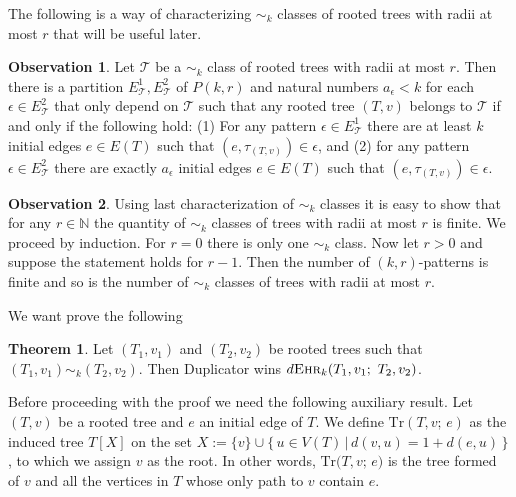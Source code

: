 \documentclass[12pt,notitlepage,a4paper]{article}
\theoremstyle{definition}
\newtheorem{theorem}{Theorem}[section]
\newtheorem{obs}{Observation}[section]
\newcommand{\N}{\mathbb{N}}
\newcommand{\ehr}{\textsc{Ehr}}
\begin{document}
The following is a way of characterizing $\sim_k$ classes
of rooted trees with radii at most $r$ that will be useful later. 

\begin{obs}\label{obs:equivalenttrees}
Let $\mathcal{T}$ be a $\sim_k$ class of rooted trees with
radii at most $r$. Then there is a partition $E^1_\mathcal{T},
E^2_\mathcal{T}$ of $P(k,r)$ and natural numbers $a_\epsilon<k$
for each $\epsilon\in E^2_\mathcal{T}$ that only depend on 
$\mathcal{T}$ such that any rooted tree $(T,v)$ belongs to
$\mathcal{T}$ if and only if the following hold: (1) For any pattern 
$\epsilon\in E^1_\mathcal{T}$ there are at least $k$ initial edges $e\in E(T)$ such that
$(e,\tau_{(T,v)})\in \epsilon$, and (2) for any pattern 
$\epsilon\in E^2_\mathcal{T}$ there are exactly
$a_\epsilon$ initial edges $e\in E(T)$ such that
$(e,\tau_{(T,v)})\in \epsilon$.	
\end{obs}

\begin{obs}\label{obs:finitetrees}
	Using last characterization of $\sim_k$ classes
	it is easy to show that for any $r\in \N$ the quantity
	of $\sim_k$ classes of trees with radii at most $r$ is finite. 
	We proceed by induction. For $r=0$ there is only one $\sim_k$ class.
	Now let $r>0$ and suppose the statement holds for $r-1$. Then
	the number of $(k,r)$-patterns is finite and so is the number
	of $\sim_k$ classes of trees with radii at most $r$. 
\end{obs}


We want prove the following
\begin{theorem} \label{thm:equivalenttrees} 
	Let $(T_1,v_1)$ and $(T_2,v_2)$ be rooted trees such
	that $(T_1,v_1)\sim_k (T_2,v_2)$.
	Then Duplicator wins
	$d\ehr_{k}(T_1,v_1;\, \, T_2,v_2)$.
\end{theorem}

Before proceeding with the proof we need the following auxiliary
result. Let $(T,v)$ be a rooted tree and $e$ an 
initial edge of $T$. We define $\mathrm{Tr}(T,v;\, e)$ as
the induced tree $T[X]$ on the set
$X:=\{v\} \cup \{\, u\in V(T) \, | \, d(v,u) = 1 + d(e,u) \,\}$,
to which we assign $v$ as the root. In other words, 
$\mathrm{Tr}\big(T,v;\, e\big)$ is the tree formed of 
$v$ and all the vertices
in $T$ whose only path to $v$ contain $e$. 
\end{document}
